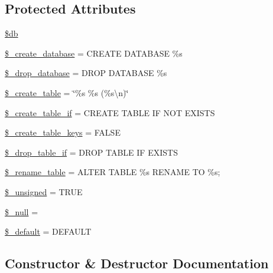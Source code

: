 \subsection*{Protected Attributes}
\begin{DoxyCompactItemize}
\item 
\mbox{\hyperlink{class_c_i___d_b__forge_a1fa3127fc82f96b1436d871ef02be319}{\$db}}
\item 
\mbox{\hyperlink{class_c_i___d_b__forge_acd23c9a8735806155f1a5d0a87c151f2}{\$\+\_\+create\+\_\+database}} = \textquotesingle{}C\+R\+E\+A\+TE D\+A\+T\+A\+B\+A\+SE \%s\textquotesingle{}
\item 
\mbox{\hyperlink{class_c_i___d_b__forge_a8305b12fc17f6f87778260ebdff287b4}{\$\+\_\+drop\+\_\+database}} = \textquotesingle{}D\+R\+OP D\+A\+T\+A\+B\+A\+SE \%s\textquotesingle{}
\item 
\mbox{\hyperlink{class_c_i___d_b__forge_a5950510a854f546e14f781b079a0a2b0}{\$\+\_\+create\+\_\+table}} = \char`\"{}\%s \%s (\%s\textbackslash{}n)\char`\"{}
\item 
\mbox{\hyperlink{class_c_i___d_b__forge_a2f6484fcb8d1dc3eef67a637227cd583}{\$\+\_\+create\+\_\+table\+\_\+if}} = \textquotesingle{}C\+R\+E\+A\+TE T\+A\+B\+LE IF N\+OT E\+X\+I\+S\+TS\textquotesingle{}
\item 
\mbox{\hyperlink{class_c_i___d_b__forge_a73e07acdd35c948ad353903c2827af6e}{\$\+\_\+create\+\_\+table\+\_\+keys}} = F\+A\+L\+SE
\item 
\mbox{\hyperlink{class_c_i___d_b__forge_a92a8a9145a7fc91e252e58d019373581}{\$\+\_\+drop\+\_\+table\+\_\+if}} = \textquotesingle{}D\+R\+OP T\+A\+B\+LE IF E\+X\+I\+S\+TS\textquotesingle{}
\item 
\mbox{\hyperlink{class_c_i___d_b__forge_a1a649e7cf9de16bcf932977b18bc91de}{\$\+\_\+rename\+\_\+table}} = \textquotesingle{}A\+L\+T\+ER T\+A\+B\+LE \%s R\+E\+N\+A\+ME TO \%s;\textquotesingle{}
\item 
\mbox{\hyperlink{class_c_i___d_b__forge_aae977ae6d61fa183f0b25422b6ddc31c}{\$\+\_\+unsigned}} = T\+R\+UE
\item 
\mbox{\hyperlink{class_c_i___d_b__forge_ae58fe6a5104d4a069a49b27533ce808f}{\$\+\_\+null}} = \textquotesingle{}\textquotesingle{}
\item 
\mbox{\hyperlink{class_c_i___d_b__forge_aa119e1b4e3d00f47a7b83b7066087915}{\$\+\_\+default}} = \textquotesingle{} D\+E\+F\+A\+U\+LT \textquotesingle{}
\end{DoxyCompactItemize}


\subsection{Constructor \& Destructor Documentation}
\mbox{\label{class_c_i___d_b__forge_aaf2ef772755ec6f361d44e16cc9ffd69}} 
